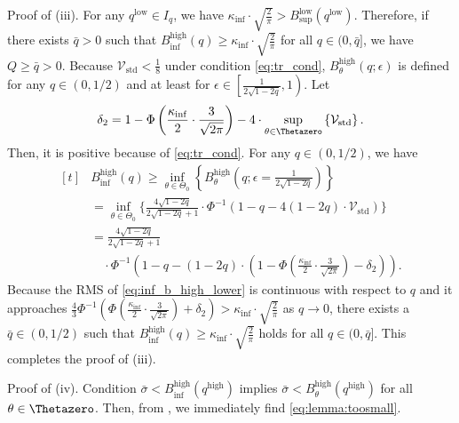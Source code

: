 \documentclass[journal]{IEEEtran}
\providecommand{\E}{\mathbb{E}} %
\renewcommand{\geq}{\geqslant} %
\DeclarePairedDelimiter{\norm}{\lVert}{\rVert}
\theoremstyle{definition}
\begin{document}
Proof of (iii).
For any $q^\mathrm{low} \in I_q$, we have 
$\kappa_{\inf}\cdot\sqrt{\frac{2}{\pi}} > B_{\sup}^\mathrm{low}(q^\mathrm{low})$. 
Therefore, if there exists $\bar{q} > 0$ such that $B_{\inf}^\text{high}(q) \geq\kappa_{\inf}\cdot\sqrt{\frac{2}{\pi}}$ for all $q \in (0, \bar{q}]$, we have $Q \geq \bar{q} > 0$.
Because $\mathcal{V}_\mathrm{std} < \frac18$ under condition \eqref{eq:tr_cond}, $B_\theta^\mathrm{high}(q; \epsilon)$ is defined for any $q \in (0, 1/2)$ and at least for $\epsilon \in \left[\frac{1}{2\sqrt{1 - 2q}}, 1 \right)$. 
Let 
\begin{equation}
\delta_2 = 
 1 - \Phi\left( \frac{\kappa_{\inf}}{2}\cdot\frac{3}{\sqrt{2\pi}}\right)
 - 4\cdot\underset{\theta\in\Thetazero}{\sup}
\left\{\mathcal{V}_\mathrm{std}  \right\}
 .
\end{equation}
Then, it is positive because of \eqref{eq:tr_cond}. 
For any $q \in (0, 1/2)$, we have
\begin{equation}
\begin{aligned}[t]
\label{eq:inf_b_high_lower}
&B_{\inf}^\text{high}(q)
\geq
\underset{\theta \in \Theta_0}{\inf}\left\{
B_\theta^\text{high}\left(q; \epsilon=\frac{1}{2\sqrt{1 - 2q}}\right) \right\}
\\
&=
\underset{\theta \in \Theta_0}{\inf}
\Bigg\{
\frac{4 \sqrt{1 - 2q}}{2 \sqrt{1 - 2q} + 1} 
\cdot \Phi^{-1} \left(1 - q - 4(1 - 2q) \cdot \mathcal{V}_\mathrm{std}\right)  
\Bigg\}
\\
&=
\frac{4 \sqrt{1 - 2q}}{2 \sqrt{1 - 2q} + 1}
\\
&\quad\cdot \Phi^{-1} \left(1 - q - (1 - 2q) \cdot \left(1 - \Phi\left( \frac{\kappa_{\inf}}{2}\cdot\frac{3}{\sqrt{2\pi}}\right) - \delta_2\right) \right) 
.
\end{aligned}
\end{equation}
Because the RMS of \eqref{eq:inf_b_high_lower} is continuous with respect to $q$ and it approaches $\frac{4}{3} \Phi^{-1} \left( \Phi\left( \frac{\kappa_{\inf}}{2}\cdot\frac{3}{\sqrt{2\pi}}\right) + \delta_2\right) >\kappa_{\inf}\cdot\sqrt{\frac{2}{\pi}}$  as $q \to 0$, there exists a $\bar{q} \in (0, 1/2)$ such that 
$B_{\inf}^\text{high}(q) \geq \kappa_{\inf}\cdot\sqrt{\frac{2}{\pi}}$ holds for all $q \in (0, \bar{q}]$. 
This completes the proof of (iii).

Proof of (iv). 
Condition $\bar\sigma < B_{\inf}^\mathrm{high}(q^\mathrm{high})$ implies $\bar\sigma < B_\theta^\mathrm{high}(q^\mathrm{high})$ for all $\theta\in\Thetazero$.
Then, from , we immediately find \eqref{eq:lemma:toosmall}.
\end{document}
